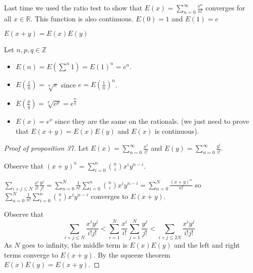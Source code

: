\documentclass{article}
\newcommand{\R}{\mathbb{R}}
\newcommand{\Z}{\mathbb{Z}}
\begin{document}
\begin{example}
Last time we used the ratio test to show that $E(x)=\sum_{n=0}^\infty\frac{x^n}{n!}$ converges for all $x\in \R$. This function is also continuous. $E(0)=1$ and $E(1)=e$
\end{example}
\begin{proposition}
$E(x+y)=E(x)E(y)$
\end{proposition}
\begin{corollary}
Let $n,p,q\in\Z$
\begin{itemize}
\item $E(n)=E(\sum^n 1)=E(1)^n=e^n$.
\item $E(\frac{1}{n})=\sqrt[n]{e}$ since $e=E(\frac{1}{n})^n$.
\item $E(\frac{p}{q})=\sqrt[q]{e^p}=e^\frac{p}{q}$
\item $E(x)=e^x$ since they are the same on the rationals. (we just need to prove that $E(x+y)=E(x)E(y)$ and $E(x)$ is continuous).
\end{itemize}
\end{corollary}
\begin{proof}[Proof of proposition 37]
Let $E(x)=\sum_{n=0}^\infty\frac{x^i}{i!}$ and $E(y)=\sum_{n=0}^\infty\frac{y^i}{i!}$.

Observe that $(x+y)^n=\sum_{i=0}^n{n\choose i}x^iy^{n-i}$.

$\sum_{i+j\leq N}\frac{x^i}{i!}\frac{y^j}{j!}=\sum_{n=0}^N \frac{1}{n!}\sum_{i=0}^n{n\choose i}x^iy^{n-i}=\sum_{n=0}^N\frac{(x+y)^n}{n!}$ so $\sum_{n=0}^N \frac{1}{n!}\sum_{i=0}^n{n\choose i}x^iy^{n-i}$ converges to $E(x+y)$.

Observe that $$\sum_{i+j\leq N} \frac{x^iy^j}{i!j!}<\sum_{i=1}^N\frac{x^i}{i!}\sum_{j=1}^N\frac{y^j}{j!}<\sum_{i+j\leq 2N}\frac{x^iy^j}{i!j!}$$
As $N$ goes to infinity, the middle term is $E(x)E(y)$ and the left and right terms converge to $E(x+y)$. By the squeeze theorem $E(x)E(y)=E(x+y)$.
\end{proof}
\end{document}
